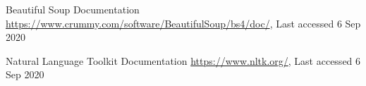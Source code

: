\documentclass[runningheads]{llncs}
\begin{document}
\begin{thebibliography}{8}
        Beautiful Soup Documentation \url{https://www.crummy.com/software/BeautifulSoup/bs4/doc/}, Last accessed 6 Sep 2020

        Natural Language Toolkit Documentation \url{https://www.nltk.org/}, Last accessed 6 Sep 2020





\end{thebibliography}
\end{document}
